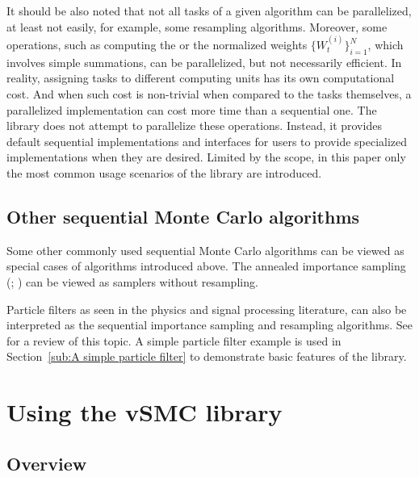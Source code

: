 \documentclass[11pt, fontset=Minion, showoverfull,
bib, mintcode, minted=cache]{marticle}
\begin{document}
It should be also noted that not all tasks of a given \smc algorithm can be
parallelized, at least not easily, for example, some resampling algorithms.
Moreover, some operations, such as computing the \ess or the normalized
weights $\{W_t^{(i)}\}_{i=1}^N$, which involves simple summations, can be
parallelized, but not necessarily efficient. In reality, assigning tasks to
different computing units has its own computational cost. And when such cost
is non-trivial when compared to the tasks themselves, a parallelized
implementation can cost more time than a sequential one. The \vsmc library
does not attempt to parallelize these operations. Instead, it provides default
sequential implementations and interfaces for users to provide specialized
implementations when they are desired. Limited by the scope, in this paper
only the most common usage scenarios of the library are introduced.

\subsection{Other sequential Monte Carlo algorithms}
\label{sub:Other sequential Monte Carlo algorithms}

Some other commonly used sequential Monte Carlo algorithms can be viewed as
special cases of algorithms introduced above. The annealed importance sampling
(\ais; \textcite{Neal:2001we}) can be viewed as \smc samplers without resampling.

Particle filters as seen in the physics and signal processing literature, can
also be interpreted as the sequential importance sampling and resampling
algorithms. See \textcite{Doucet:2011us} for a review of this topic. A simple
particle filter example is used in Section~\ref{sub:A simple particle filter}
to demonstrate basic features of the \vsmc library.

\section{Using the vSMC library}
\label{sec:Using the vSMC library}

\subsection{Overview}
\end{document}
